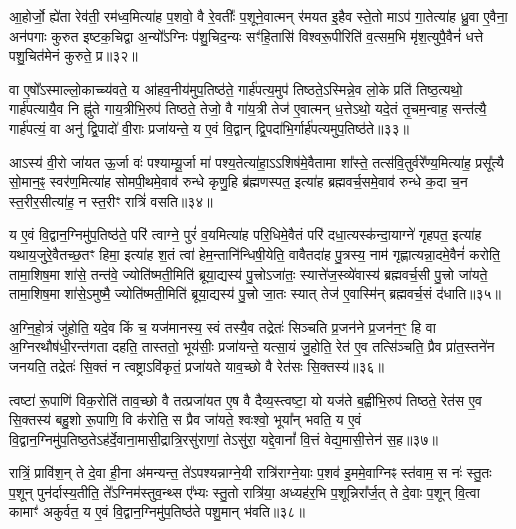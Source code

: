 आ॒होर्जो॒ ह्ये॑ता रेव॑ती॒ रम॑ध्व॒मित्या॑ह प॒शवो॒ वै रे॒वतीः᳚ प॒शूने॒वात्मन् र॑मयत इ॒हैव स्ते॒तो मा\-ऽप॑ गा॒तेत्या॑ह ध्रु॒वा ए॒वैना॒ अन॑पगाः कुरुत इष्टक॒चिद्वा अ॒न्यो᳚\-ऽग्निः प॑शु॒चिद॒न्यः सꣳ॑हि॒तासि॑ विश्वरू॒पीरिति॑ व॒त्सम॒भि मृ॑श॒त्युपै॒वैनं॑ धत्ते पशु॒चित॑मेनं कुरुते॒ प्र॥३२॥

वा ए॒षो᳚\-ऽस्माल्लो॒काच्च्य॑वते॒ य आ॑हव॒नीय॑मुप॒तिष्ठ॑ते॒ गार्\mbox{}ह॑पत्य॒मुप॑ तिष्ठते॒\-ऽस्मिन्ने॒व लो॒के प्रति॑ तिष्ठ॒त्यथो॒ गार्\mbox{}ह॑पत्यायै॒व नि ह्नु॑ते गाय॒त्रीभि॒रुप॑ तिष्ठते॒ तेजो॒ वै गा॑य॒त्री तेज॑ ए॒वात्मन् ध॒त्ते\-ऽथो॒ यदे॒तं तृ॒चम॒न्वाह॒ सन्त॑त्यै॒ गार्\mbox{}ह॑पत्यं॒ वा अनु॑ द्वि॒पादो॑ वी॒राः प्रजा॑यन्ते॒ य ए॒वं वि॒द्वान् द्वि॒पदा॑भि॒र्गार्\mbox{}ह॑पत्यमुप॒तिष्ठ॑ते॥३३॥

आ\-ऽस्य॑ वी॒रो जा॑यत ऊ॒र्जा वः॑ पश्याम्यू॒र्जा मा॑ पश्य॒तेत्या॑हा॒\-ऽ\-ऽशिष॑मे॒वैतामा शा᳚स्ते॒ तत्स॑वि॒तुर्वरे᳚ण्य॒मित्या॑ह॒ प्रसू᳚त्यै सो॒मान॒ꣴ॒ स्वर॑ण॒मित्या॑ह सोमपी॒थमे॒वाव॑ रुन्धे कृणु॒हि ब्र॑ह्मणस्पत॒ इत्या॑ह ब्रह्मवर्च॒समे॒वाव॑ रुन्धे क॒दा च॒न स्त॒रीर॒सीत्या॑ह॒ न स्त॒रीꣳ रात्रिं॑ वसति॥३४॥

य ए॒वं वि॒द्वान॒ग्निमु॑प॒तिष्ठ॑ते॒ परि॑ त्वाग्ने॒ पुरं॑ व॒यमित्या॑ह परि॒धिमे॒वैतं परि॑ दधा॒त्यस्क॑न्दा॒याग्ने॑ गृहपत॒ इत्या॑ह यथाय॒जुरे॒वैतच्छ॒तꣳ हिमा॒ इत्या॑ह श॒तं त्वा॑ हेम॒न्तानि॑न्धिषी॒येति॒ वावैतदा॑ह पु॒त्रस्य॒ नाम॑ गृह्णात्यन्ना॒दमे॒वैनं॑ करोति॒ तामा॒शिष॒मा शा॑से॒ तन्त॑वे॒ ज्योति॑ष्मती॒मिति॑ ब्रूया॒द्यस्य॑ पु॒त्त्रो\-ऽजा॑तः॒ स्यात्ते॑ज॒स्व्ये॑वास्य॑ ब्रह्मवर्च॒सी पु॒त्त्रो जा॑यते॒ तामा॒शिष॒मा शा॑से॒\-ऽमुष्मै॒ ज्योति॑ष्मती॒मिति॑ ब्रूया॒द्यस्य॑ पु॒त्त्रो जा॒तः स्यात् तेज॑ ए॒वास्मि॑न् ब्रह्मवर्च॒सं द॑धाति॥३५॥

{}

अ॒ग्नि॒हो॒त्रं जु॑होति॒ यदे॒व किं च॒ यज॑मानस्य॒ स्वं तस्यै॒व तद्रेतः॑ सिञ्चति प्र॒जन॑ने प्र॒जन॑न॒ꣳ॒ हि वा अ॒ग्निरथौष॑धी॒रन्त॑गता दहति॒ तास्ततो॒ भूय॑सीः॒ प्रजा॑यन्ते॒ यत्सा॒यं जु॒होति॒ रेत॑ ए॒व तत्सि॑ञ्चति॒ प्रैव प्रा॑त॒स्तने॑न जनयति॒ तद्रेतः॑ सि॒क्तं न त्वष्ट्रा\-ऽवि॑कृतं॒ प्रजा॑यते याव॒च्छो वै रेत॑सः सि॒क्तस्य॑॥३६॥

त्वष्टा॑ रू॒पाणि॑ विक॒रोति॑ ताव॒च्छो वै तत्प्रजा॑यत ए॒ष वै दैव्य॒स्त्वष्टा॒ यो यज॑ते ब॒ह्वीभि॒रुप॑ तिष्ठते॒ रेत॑स ए॒व सि॒क्तस्य॑ बहु॒शो रू॒पाणि॒ वि क॑रोति॒ स प्रैव जा॑यते॒ श्वःश्वो॒ भूया᳚न् भवति॒ य ए॒वं वि॒द्वान॒ग्निमु॑प॒तिष्ठ॒ते\-ऽह॑र्दे॒वाना॒मासी॒द्रात्रि॒रसु॑राणां॒ ते\-ऽसु॑रा॒ यद्दे॒वानां᳚ वि॒त्तं वेद्य॒मासी॒त्तेन॑ स॒ह॥३७॥

रात्रिं॒ प्रावि॑श॒न् ते दे॒वा ही॒ना अ॑मन्यन्त॒ ते॑\-ऽपश्यन्नाग्ने॒यी रात्रि॑राग्ने॒याः प॒शव॑ इ॒ममे॒वाग्निꣴ स्त॑वाम॒ स नः॑ स्तु॒तः प॒शून् पुन॑र्दास्य॒तीति॒ ते᳚\-ऽग्निम॑स्तुव॒न्थ्स ए᳚भ्यः स्तु॒तो रात्रि॑या॒ अध्यह॑र॒भि प॒शून्निरा᳚र्ज॒त् ते दे॒वाः प॒शून् वि॒त्वा कामाꣳ॑ अकुर्वत॒ य ए॒वं वि॒द्वान॒ग्निमु॑प॒तिष्ठ॑ते पशु॒मान् भ॑वति॥३८॥

